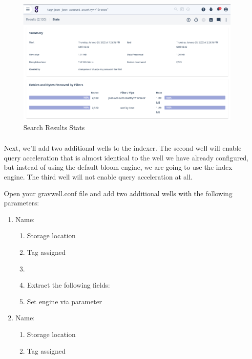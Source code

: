 {\begin{figure}
	\includegraphics{images/stats-accel.png}
	\caption{Search Results Stats}
	\label{fig:stats-accel}
\end{figure}

\hypertarget{h.cpnsaxr7kale}{%
\subsubsection{\texorpdfstring{{}}{}}\label{h.cpnsaxr7kale}}

Next, we'll add two additional wells to the indexer.
The second well will enable query acceleration that is almost identical
to the well we have already configured, but instead of using the default
bloom engine, we are going to use the index engine. The third well will
not enable query acceleration at all.

Open your gravwell.conf file and add two additional wells with the
following parameters:

\begin{enumerate}
	\item Name: 
	\begin{enumerate}
		\item Storage location 
		\item Tag  assigned
		\item {}
		\item Extract the following fields: 
		\item Set engine via  parameter
	\end{enumerate}
	\item Name: 
	\begin{enumerate}
		\item Storage location 
		\item Tag  assigned
	\end{enumerate}
\end{enumerate}

}
